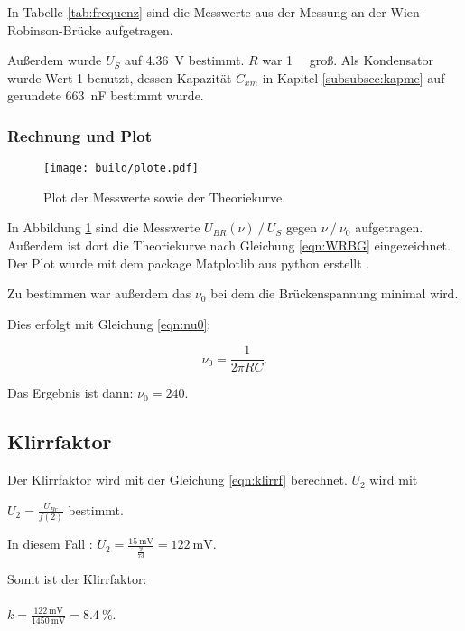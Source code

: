 In Tabelle \ref{tab:frequenz} sind die Messwerte aus der Messung an der
Wien-Robinson-Brücke aufgetragen.

Außerdem wurde $U_S$ auf \SI{4.36}{\volt} bestimmt. $R$ war \SI{1}{\kilo\Omega}
groß. Als Kondensator wurde Wert 1 benutzt, dessen Kapazität $C_{xm}$ in Kapitel
\ref{subsubsec:kapme} auf gerundete \SI{663}{\nano\farad} bestimmt wurde.

\FloatBarrier

\subsubsection{Rechnung und Plot}

\begin{figure}[h]
  \centering
  \texttt{[image: build/plote.pdf]}
  \caption{Plot der Messwerte sowie der Theoriekurve.}
  \label{fig:WRBplot}
\end{figure}

In Abbildung \ref{fig:WRBplot} sind die Messwerte $U_{BR}(\nu) \ /\ U_S$ gegen
$\nu \ /\ \nu_0$ aufgetragen. Außerdem ist dort die Theoriekurve nach Gleichung
\eqref{eqn:WRBG} eingezeichnet. Der Plot wurde mit dem package Matplotlib aus
python erstellt \cite{matplotlib}.

Zu bestimmen war außerdem das $\nu_0$ bei dem die Brückenspannung minimal wird.

Dies erfolgt mit Gleichung \eqref{eqn:nu0}:

\begin{equation}
  \nu_0 = \frac{1}{2 \pi R C}.
  \label{eqn:nu0}
\end{equation}

Das Ergebnis ist dann: $\nu_0 = 240$.

\subsection{Klirrfaktor}

Der Klirrfaktor wird mit der Gleichung \eqref{eqn:klirrf} berechnet.
$U_2$ wird mit

$U_2 = \frac{U_{Br}}{f(2)}$ bestimmt.

In diesem Fall : $U_2 = \frac{\SI{15}{\milli\volt}}{\frac{9}{73}} =
\SI{122}{\milli\volt}$.

Somit ist der Klirrfaktor:\\
\\$k = \frac{\SI{122}{\milli\volt}}{\SI{1450}{\milli\volt}} = \SI{8.4}{\percent}$.
